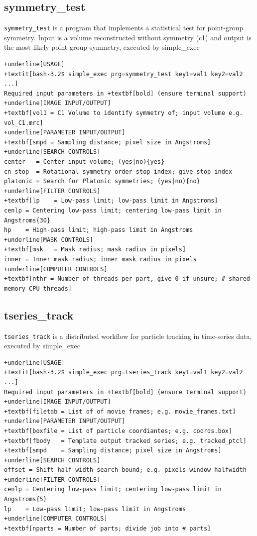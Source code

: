 \documentclass[a4paper,11pt]{article}
\newcommand{\prgname}[1]{\textcolor{NavyBlue}{\texttt{#1}}}
\begin{document}
\subsection{symmetry\_test}
\label{symmetry_test}
\prgname{symmetry\_test} is a program that implements a statistical test for point-group symmetry. Input is a volume reconstructed without symmetry (c1) and output is the most likely point-group symmetry, executed by simple\_exec
\begin{Verbatim}[commandchars=+\[\],fontsize=\small,breaklines=true]
+underline[USAGE]
+textit[bash-3.2$ simple_exec prg=symmetry_test key1=val1 key2=val2 ...]
Required input parameters in +textbf[bold] (ensure terminal support)
+underline[IMAGE INPUT/OUTPUT]
+textbf[vol1 = C1 Volume to identify symmetry of; input volume e.g. vol_C1.mrc]
+underline[PARAMETER INPUT/OUTPUT]
+textbf[smpd = Sampling distance; pixel size in Angstroms]
+underline[SEARCH CONTROLS]
center   = Center input volume; (yes|no){yes}
cn_stop  = Rotational symmetry order stop index; give stop index
platonic = Search for Platonic symmetries; (yes|no){no}
+underline[FILTER CONTROLS]
+textbf[lp    = Low-pass limit; low-pass limit in Angstroms]
cenlp = Centering low-pass limit; centering low-pass limit in Angstroms{30}
hp    = High-pass limit; high-pass limit in Angstroms
+underline[MASK CONTROLS]
+textbf[msk   = Mask radius; mask radius in pixels]
inner = Inner mask radius; inner mask radius in pixels
+underline[COMPUTER CONTROLS]
+textbf[nthr = Number of threads per part, give 0 if unsure; # shared-memory CPU threads]
\end{Verbatim}

\subsection{tseries\_track}
\label{tseries_track}
\prgname{tseries\_track} is a distributed workflow for particle tracking in time-series data, executed by simple\_exec
\begin{Verbatim}[commandchars=+\[\],fontsize=\small,breaklines=true]
+underline[USAGE]
+textit[bash-3.2$ simple_exec prg=tseries_track key1=val1 key2=val2 ...]
Required input parameters in +textbf[bold] (ensure terminal support)
+underline[IMAGE INPUT/OUTPUT]
+textbf[filetab = List of of movie frames; e.g. movie_frames.txt]
+underline[PARAMETER INPUT/OUTPUT]
+textbf[boxfile = List of particle coordiantes; e.g. coords.box]
+textbf[fbody   = Template output tracked series; e.g. tracked_ptcl]
+textbf[smpd    = Sampling distance; pixel size in Angstroms]
+underline[SEARCH CONTROLS]
offset = Shift half-width search bound; e.g. pixels window halfwidth
+underline[FILTER CONTROLS]
cenlp = Centering low-pass limit; centering low-pass limit in Angstroms{5}
lp    = Low-pass limit; low-pass limit in Angstroms
+underline[COMPUTER CONTROLS]
+textbf[nparts = Number of parts; divide job into # parts]
\end{Verbatim}
\end{document}
